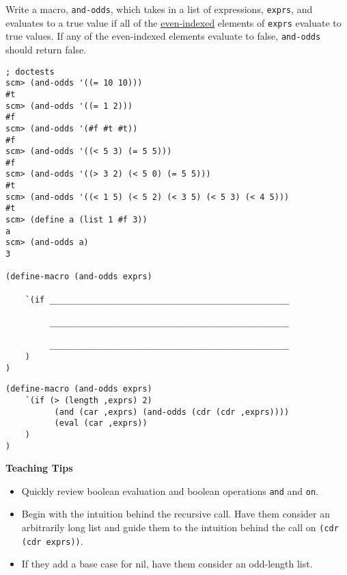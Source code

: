 \question
Write a macro, \lstinline{and-odds}, which takes in a list of expressions, \lstinline{exprs}, and evaluates to a true value if all of the \underline{even-indexed} elements of \lstinline{exprs} evaluate to true values. If any of the even-indexed elements evaluate to false, \lstinline{and-odds} should return false.

\begin{lstlisting}
; doctests
scm> (and-odds '((= 10 10)))
#t
scm> (and-odds '((= 1 2)))
#f
scm> (and-odds '(#f #t #t))
#f
scm> (and-odds '((< 5 3) (= 5 5)))
#f
scm> (and-odds '((> 3 2) (< 5 0) (= 5 5)))
#t
scm> (and-odds '((< 1 5) (< 5 2) (< 3 5) (< 5 3) (< 4 5)))
#t
scm> (define a (list 1 #f 3))
a
scm> (and-odds a)
3

(define-macro (and-odds exprs)

    `(if _________________________________________________

         _________________________________________________

         _________________________________________________
    )
)
\end{lstlisting}

\begin{solution}
\begin{lstlisting}
(define-macro (and-odds exprs)
    `(if (> (length ,exprs) 2)
          (and (car ,exprs) (and-odds (cdr (cdr ,exprs))))
          (eval (car ,exprs))
    )
)
\end{lstlisting}
\end{solution}

\begin{blocksection}
\begin{guide}
\textbf{Teaching Tips}
\begin{itemize}
	\item Quickly review boolean evaluation and boolean operations \lstinline{and} and \lstinline{on}.
	\item Begin with the intuition behind the recursive call. Have them consider an arbitrarily long list and guide them to the intuition behind the call on \lstinline{(cdr (cdr exprs))}.
	\item If they add a base case for nil, have them consider an odd-length list.
\end{itemize}
\end{guide}
\end{blocksection}
